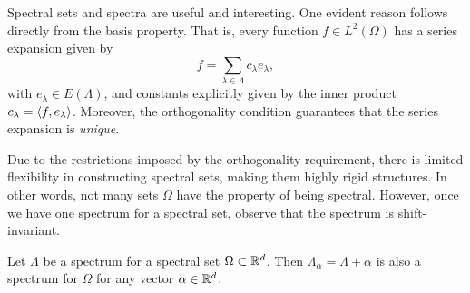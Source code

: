 \documentclass[../thesis.tex]{subfiles}
\begin{document}
Spectral sets and spectra are useful and interesting. One evident reason follows directly from the basis property. That is, every function $f \in L^2(\Omega)$ has a series expansion given by
\begin{equation*}
    f = \sum_{\lambda \in \Lambda} c_{\lambda} e_{\lambda},
\end{equation*}
with $e_\lambda \in E(\Lambda)$, and constants explicitly given by the inner product $c_{\lambda}=\langle f,e_{\lambda}\rangle$. Moreover, the orthogonality condition guarantees that the series expansion is \emph{unique}.

Due to the restrictions imposed by the orthogonality requirement, there is limited flexibility in constructing spectral sets, making them highly rigid structures. In other words, not many sets $\Omega$ have the property of being spectral. However, once we have one spectrum for a spectral set, observe that the spectrum is shift-invariant.
\begin{lemma}\label{lem:spectrum_shift_is_spectrum}
    Let $\Lambda$ be a spectrum for a spectral set $\Omega \subset \mathbb{R}^d$. Then $\Lambda_\alpha = \Lambda + \alpha$ is also a spectrum for $\Omega$ for any vector $\alpha \in \mathbb{R}^d$.
\end{lemma}
\end{document}
